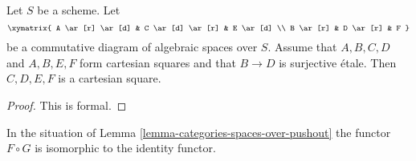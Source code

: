 \begin{lemma}
\label{lemma-diagram}
Let $S$ be a scheme. Let
$$
\xymatrix{
A \ar[r] \ar[d] & C \ar[d] \ar[r] & E \ar[d] \\
B \ar[r] & D \ar[r] & F
}
$$
be a commutative diagram of algebraic spaces over $S$.
Assume that $A, B, C, D$ and $A, B, E, F$ form cartesian squares
and that $B \to D$ is surjective \'etale.
Then $C, D, E, F$ is a cartesian square.
\end{lemma}

\begin{proof}
This is formal.
\end{proof}

\begin{lemma}
\label{lemma-equivalence-categories-spaces-over-pushout}
In the situation of Lemma \ref{lemma-categories-spaces-over-pushout}
the functor $F \circ G$ is isomorphic to the identity functor.
\end{lemma}

